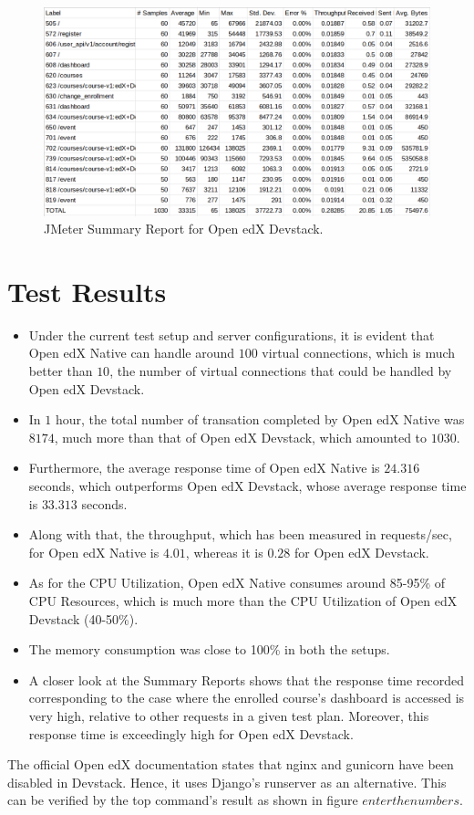 \documentclass[12pt]{article}
\begin{document}
\begin{figure}[h!]
	\centering
	\includegraphics[width=\textwidth,height=\textheight,keepaspectratio]{intro/4.png}
	\caption{JMeter Summary Report for Open edX Devstack.}
\end{figure}
\clearpage
\section*{Test Results} 
\begin{itemize}
	\item Under the current test setup and server configurations, it is evident that Open edX Native can handle around $100$ virtual connections, which is much better than $10$, the number of virtual connections that could be handled by Open edX Devstack.
	\item In $1$ hour, the total number of transation completed by Open edX Native was $8174$, much more than that of Open edX Devstack, which amounted to $1030$.
	\item Furthermore, the average response time of Open edX Native is $24.316$ seconds, which outperforms Open edX Devstack, whose average response time is $33.313$ seconds.
	\item Along with that, the throughput, which has been measured in requests/sec, for Open edX Native is $4.01$, whereas it is $0.28$ for Open edX Devstack.
	\item As for the CPU Utilization, Open edX Native consumes around 85-95\% of CPU Resources, which is much more than the CPU Utilization of Open edX Devstack (40-50\%).
	\item The memory consumption was close to 100\% in both the setups.
	\item A closer look at the Summary Reports shows that the response time recorded corresponding to the case where the enrolled course's dashboard is accessed is very high, relative to other requests in a given test plan. Moreover, this response time is exceedingly high for Open edX Devstack.
\end{itemize}

\par
The official Open edX documentation states that nginx and gunicorn have been disabled in Devstack. Hence, it uses Django's runserver as an alternative. This can be verified by the top command's result as shown in figure $enter the numbers$.




\end{document}
